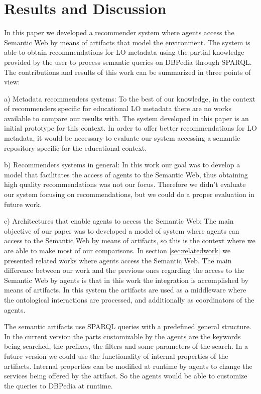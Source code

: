\documentclass[a4paper,twoside]{article}
\begin{document}
\section{Results and Discussion}
\noindent In this paper we developed a recommender system where agents access the Semantic Web by means of artifacts that model the environment. The system is able to obtain recommendations for LO metadata using the partial knowledge provided by the user to process semantic queries on DBPedia through SPARQL. The contributions and results of this work can be summarized in three points of view:

a) Metadata recommenders systems: To the best of our knowledge, in the context of recommenders specific for educational LO metadata there are no works available to compare our results with. The system developed in this paper is an initial prototype for this context. In order to offer better recommendations for LO metadata, it would be necessary to evaluate our system accessing a semantic repository specific for the educational context.

b) Recommenders systems in general: In this work our goal was to develop a model that facilitates the access of agents to the Semantic Web, thus obtaining high quality recommendations was not our focus. Therefore we didn't evaluate our system focusing on recommendations, but we could do a proper evaluation in future work.

c) Architectures that enable agents to access the Semantic Web: The main objective of our paper was to developed a model of system where agents can access to the Semantic Web by means of artifacts, so this is the context where we are able to make most of our comparisons. In section \ref{sec:relatedwork} we presented related works where agents access the Semantic Web. The main difference between our work and the previous ones regarding the access to the Semantic Web by agents is that in this work the integration is accomplished by means of artifacts. In this system the artifacts are used as a middleware where the ontological interactions are processed, and additionally as coordinators of the agents.

The semantic artifacts use SPARQL queries with a predefined general structure. In the current version the parts customizable by the agents are the keywords being searched, the prefixes, the filters and some parameters of the search. In a future version we could use the functionality of internal properties of the artifacts. Internal properties can be modified at runtime by agents to change the services being offered by the artifact. So the agents would be able to customize the queries to DBPedia at runtime.
\end{document}

